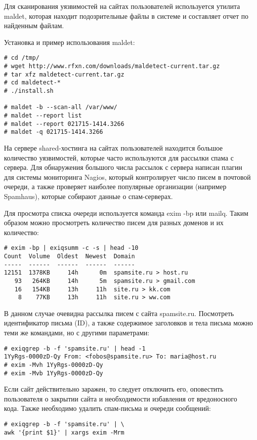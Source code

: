 Для сканирования уязвимостей на сайтах пользователей используется утилита maldet, которая находит подозрительные файлы в системе и составляет отчет по найденным файлам.

Установка и пример использования maldet:
\begin{lstlisting}
# cd /tmp/
# wget http://www.rfxn.com/downloads/maldetect-current.tar.gz
# tar xfz maldetect-current.tar.gz
# cd maldetect-*
# ./install.sh

# maldet -b --scan-all /var/www/
# maldet --report list
# maldet --report 021715-1414.3266
# maldet -q 021715-1414.3266
\end{lstlisting}

На сервере shared-хостинга на сайтах пользователей находится большое количество уязвимостей, которые часто используются для рассылки спама с сервера.
Для обнаружения большого числа рассылок с сервера написан плагин для системы мониторинга Nagios, который контролирует число писем в почтовой очереди, а также проверяет наиболее популярные организации (например Spamhaus), которые собирают данные о спам-серверах.

Для просмотра списка очереди используется команда exim -bp или mailq.
Таким образом можно просмотреть количество писем для разных доменов и их количество:
\begin{lstlisting}
# exim -bp | exiqsumm -c -s | head -10
Count  Volume  Oldest  Newest  Domain
-----  ------  ------  ------  ------
12151  1378KB     14h      0m  spamsite.ru > host.ru
   93   264KB     14h      5m  spamsite.ru > gmail.com
   16   154KB     13h     11h  site.ru > kk.com
    8    77KB     13h     11h  site.ru > ww.com
\end{lstlisting}

В данном случае очевидна рассылка писем с сайта spamsite.ru.
Посмотреть идентификатор письма (ID), а также содержимое заголовков и тела письма можно теми же командами, но с другими параметрами:
\begin{lstlisting}
# exiqgrep -b -f 'spamsite.ru' | head -1
1YyRgs-0000zD-Qy From: <fobos@spamsite.ru> To: maria@host.ru
# exim -Mvh 1YyRgs-0000zD-Qy
# exim -Mvb 1YyRgs-0000zD-Qy
\end{lstlisting}

Если сайт действительно заражен, то следует отключить его, оповестить пользователя о закрытии сайта и необходимости избавления от вредоносного кода.
Также необходимо удалить спам-письма и очереди сообщений:
\begin{lstlisting}
# exiqgrep -b -f 'spamsite.ru' | \
awk '{print $1}' | xargs exim -Mrm
\end{lstlisting}

